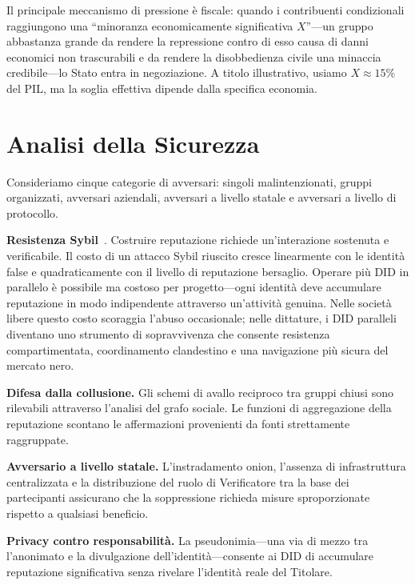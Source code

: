 \documentclass[11pt,a4paper,twocolumn]{article}
\begin{document}
Il principale meccanismo di pressione è fiscale: quando i contribuenti condizionali raggiungono una ``minoranza economicamente significativa $X$''---un gruppo abbastanza grande da rendere la repressione contro di esso causa di danni economici non trascurabili e da rendere la disobbedienza civile una minaccia credibile---lo Stato entra in negoziazione. A titolo illustrativo, usiamo $X \approx 15\%$ del PIL, ma la soglia effettiva dipende dalla specifica economia.

\section{Analisi della Sicurezza}

Consideriamo cinque categorie di avversari: singoli malintenzionati, gruppi organizzati, avversari aziendali, avversari a livello statale e avversari a livello di protocollo.

\textbf{Resistenza Sybil}~\cite{douceur2002}. Costruire reputazione richiede un'interazione sostenuta e verificabile. Il costo di un attacco Sybil riuscito cresce linearmente con le identità false e quadraticamente con il livello di reputazione bersaglio. Operare più DID in parallelo è possibile ma costoso per progetto---ogni identità deve accumulare reputazione in modo indipendente attraverso un'attività genuina. Nelle società libere questo costo scoraggia l'abuso occasionale; nelle dittature, i DID paralleli diventano uno strumento di sopravvivenza che consente resistenza compartimentata, coordinamento clandestino e una navigazione più sicura del mercato nero.

\textbf{Difesa dalla collusione.} Gli schemi di avallo reciproco tra gruppi chiusi sono rilevabili attraverso l'analisi del grafo sociale. Le funzioni di aggregazione della reputazione scontano le affermazioni provenienti da fonti strettamente raggruppate.

\textbf{Avversario a livello statale.} L'instradamento onion, l'assenza di infrastruttura centralizzata e la distribuzione del ruolo di Verificatore tra la base dei partecipanti assicurano che la soppressione richieda misure sproporzionate rispetto a qualsiasi beneficio.

\textbf{Privacy contro responsabilità.} La pseudonimia---una via di mezzo tra l'anonimato e la divulgazione dell'identità---consente ai DID di accumulare reputazione significativa senza rivelare l'identità reale del Titolare.
\end{document}
